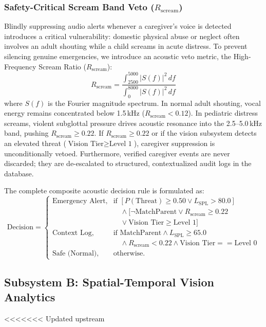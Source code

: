 \documentclass[conference]{IEEEtran}
\begin{document}
\subsubsection{Safety-Critical Scream Band Veto ($R_{\text{scream}}$)}
Blindly suppressing audio alerts whenever a caregiver's voice is detected introduces a critical vulnerability: domestic physical abuse or neglect often involves an adult shouting while a child screams in acute distress. To prevent silencing genuine emergencies, we introduce an acoustic veto metric, the High-Frequency Scream Ratio ($R_{\text{scream}}$):
\begin{equation}
R_{\text{scream}} = \frac{\int_{2500}^{5000} |S(f)|^2 \, df}{\int_{0}^{8000} |S(f)|^2 \, df} \label{eq_rscream}
\end{equation}
where $S(f)$ is the Fourier magnitude spectrum. In normal adult shouting, vocal energy remains concentrated below 1.5\,kHz ($R_{\text{scream}} < 0.12$). In pediatric distress screams, violent subglottal pressure drives acoustic resonance into the 2.5–5.0\,kHz band, pushing $R_{\text{scream}} \ge 0.22$. If $R_{\text{scream}} \ge 0.22$ or if the vision subsystem detects an elevated threat ($\text{Vision Tier} \ge \text{Level 1}$), caregiver suppression is unconditionally vetoed. Furthermore, verified caregiver events are never discarded; they are de-escalated to structured, contextualized audit logs in the database.

The complete composite acoustic decision rule is formulated as:
\begin{equation}
\text{Decision} = \begin{cases}
\text{Emergency Alert,} & \text{if } [P(\text{Threat}) \ge 0.50 \lor L_{\text{SPL}} > 80.0] \\
& \quad \land [\neg \text{MatchParent} \lor R_{\text{scream}} \ge 0.22 \\
& \quad \lor \text{Vision Tier} \ge \text{Level 1}] \\
\text{Context Log,} & \text{if } \text{MatchParent} \land L_{\text{SPL}} \ge 65.0 \\
& \quad \land R_{\text{scream}} < 0.22 \land \text{Vision Tier} == \text{Level 0} \\
\text{Safe (Normal),} & \text{otherwise.}
\end{cases} \label{eq4}
\end{equation}

\subsection{Subsystem B: Spatial-Temporal Vision Analytics}
<<<<<<< Updated upstream
\end{document}
